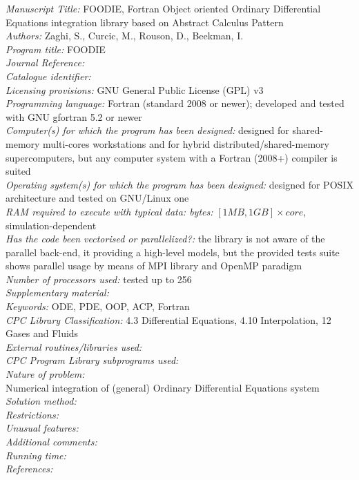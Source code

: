 \documentclass[pdftex,preprint,3p,times,numbers]{elsarticle}
\begin{document}
\begin{small}
\noindent
\emph{Manuscript Title:} FOODIE, Fortran Object oriented Ordinary Differential Equations integration library based on Abstract Calculus Pattern \\
\emph{Authors:} Zaghi, S., Curcic, M., Rouson, D., Beekman, I. \\
\emph{Program title:} FOODIE \\
\emph{Journal Reference:} \\
\emph{Catalogue identifier:} \\
\emph{Licensing provisions:} GNU General Public License (GPL) v3 \\
\emph{Programming language:} Fortran (standard 2008 or newer); developed and tested with GNU gfortran 5.2 or newer \\
\emph{Computer(s) for which the program has been designed:} designed for shared-memory multi-cores workstations and for hybrid distributed/shared-memory supercomputers, but any computer system with a Fortran (2008+) compiler is suited \\
\emph{Operating system(s) for which the program has been designed:} designed for POSIX architecture and tested on GNU/Linux one \\
\emph{RAM required to execute with typical data: bytes:} $[1MB,1GB]\times core$, simulation-dependent \\
\emph{Has the code been vectorised or parallelized?:} the library is not aware of the parallel back-end, it providing a high-level models, but the provided tests suite shows parallel usage by means of MPI library and OpenMP paradigm \\
\emph{Number of processors used:} tested up to 256 \\
\emph{Supplementary material:}    \\
\emph{Keywords:} ODE, PDE, OOP, ACP, Fortran \\
\emph{CPC Library Classification:} 4.3 Differential Equations, 4.10 Interpolation, 12 Gases and Fluids \\
\emph{External routines/libraries used:} \\
\emph{CPC Program Library subprograms used:} \\
\emph{Nature of problem:} \\
Numerical integration of (general) Ordinary Differential Equations system \\
\emph{Solution method:} \\
\emph{Restrictions:} \\
\emph{Unusual features:} \\
\emph{Additional comments:} \\
\emph{Running time:} \\
\emph{References:} \\
\end{small}
\end{document}
